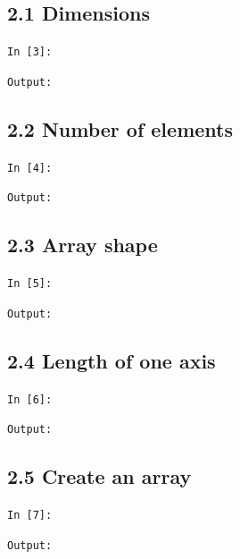 \documentclass[11pt]{article}
\begin{document}
\par\medskip\noindent\begin{minipage}{\linewidth}
\subsection*{2.1 Dimensions}
\noindent\texttt{In [3]:}

\noindent\texttt{Output:}

\end{minipage}\par

\par\medskip\noindent\begin{minipage}{\linewidth}
\subsection*{2.2 Number of elements}
\noindent\texttt{In [4]:}

\noindent\texttt{Output:}

\end{minipage}\par

\par\medskip\noindent\begin{minipage}{\linewidth}
\subsection*{2.3 Array shape}
\noindent\texttt{In [5]:}

\noindent\texttt{Output:}

\end{minipage}\par

\par\medskip\noindent\begin{minipage}{\linewidth}
\subsection*{2.4 Length of one axis}
\noindent\texttt{In [6]:}

\noindent\texttt{Output:}

\end{minipage}\par

\par\medskip\noindent\begin{minipage}{\linewidth}
\subsection*{2.5 Create an array}
\noindent\texttt{In [7]:}

\noindent\texttt{Output:}

\end{minipage}\par
\end{document}
